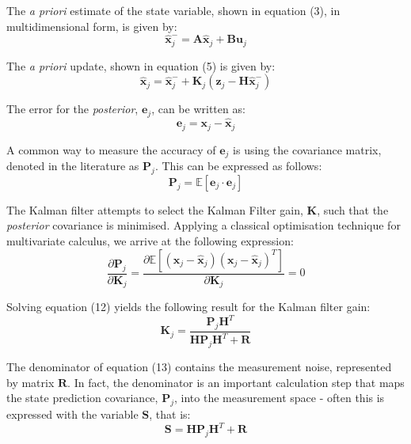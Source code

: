 \documentclass[a4paper]{article}
\begin{document}
The \textit{a priori} estimate of the state variable, shown in equation (3), in multidimensional form, is given by:
\begin{equation}
\hat{\mathbf{x}}^-_j = \mathbf{A} \hat{\mathbf{x}}_j + \mathbf{B} \mathbf{u}_j
\end{equation}

The \textit{a priori} update, shown in equation (5) is given by:
\begin{equation}
\hat{\mathbf{x}}_j = \hat{\mathbf{x}}^-_j + \mathbf{K}_j (\mathbf{z}_j - \mathbf{H} \hat{\mathbf{x}}^-_j)
\end{equation}

The error for the \textit{posterior}, $\mathbf{e}_j$, can be written as:
\begin{equation}
\mathbf{e}_j = \mathbf{x}_j - \hat{\mathbf{x}}_j
\end{equation}

A common way to measure the accuracy of $\mathbf{e}_j$ is using the covariance matrix, denoted in the literature as $\mathbf{P}_j$. This can be expressed as follows:
\begin{equation}
\mathbf{P}_j = \mathbb{E}[\mathbf{e}_j \cdot \mathbf{e}_j]
\end{equation}

The Kalman filter attempts to select the Kalman Filter gain, $\mathbf{K}$, such that the \textit{posterior} covariance is minimised. Applying a classical optimisation technique for multivariate calculus, we arrive at the following expression:
\begin{equation}
\frac{\partial \mathbf{P}_j}{\partial \mathbf{K}_j} = \frac{\partial \mathbb{E}[(\mathbf{x}_j - \hat{\mathbf{x}}_j)(\mathbf{x}_j - \hat{\mathbf{x}}_j)^T]}{\partial \mathbf{K}_j} = 0
\end{equation}

Solving equation (12) yields the following result for the Kalman filter gain:
\begin{equation}
\mathbf{K}_j = \frac{\mathbf{P}_j \mathbf{H}^T}{\mathbf{H} \mathbf{P}_j \mathbf{H}^T + \mathbf{R}}
\end{equation}

The denominator of equation (13) contains the measurement noise, represented by matrix $\mathbf{R}$. In fact, the denominator is an important calculation step that maps the state prediction covariance, $\mathbf{P}_j$, into the measurement space - often this is expressed with the variable $\mathbf{S}$, that is:
\begin{equation}
\mathbf{S} = \mathbf{H} \mathbf{P}_j \mathbf{H}^T + \mathbf{R} 
\end{equation}
\end{document}

